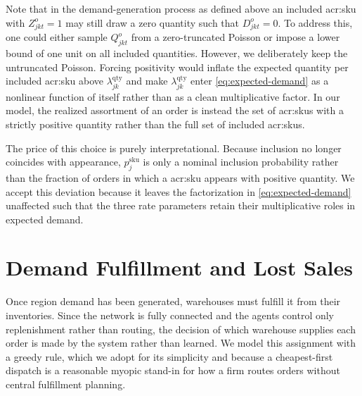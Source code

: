 Note that in the demand-generation process as defined above an included \gls{acr:sku} with $Z^{o}_{jkt} = 1$ may still draw a zero quantity such that $D^{o}_{jkt} = 0$. To address this, one could either sample $Q^{o}_{jkt}$ from a zero-truncated Poisson or impose a lower bound of one unit on all included quantities. However, we deliberately keep the untruncated Poisson. Forcing positivity would inflate the expected quantity per included \gls{acr:sku} above $\lambda^{\mathrm{qty}}_{jk}$ and make $\lambda^{\mathrm{qty}}_{jk}$ enter \autoref{eq:expected-demand} as a nonlinear function of itself rather than as a clean multiplicative factor. In our model, the realized assortment of an order is instead the set of \glspl{acr:sku} with a strictly positive quantity rather than the full set of included \glspl{acr:sku}.

The price of this choice is purely interpretational. Because inclusion no longer coincides with appearance, $p^{\mathrm{sku}}_{j}$ is only a nominal inclusion probability rather than the fraction of orders in which a \gls{acr:sku} appears with positive quantity. We accept this deviation because it leaves the factorization in \autoref{eq:expected-demand} unaffected such that the three rate parameters retain their multiplicative roles in expected demand.\\

\section{Demand Fulfillment and Lost Sales}
\label{sec:fulfillment}
Once region demand has been generated, warehouses must fulfill it from their inventories. Since the network is fully connected and the agents control only replenishment rather than routing, the decision of which warehouse supplies each order is made by the system rather than learned. We model this assignment with a greedy rule, which we adopt for its simplicity and because a cheapest-first dispatch is a reasonable myopic stand-in for how a firm routes orders without central fulfillment planning.

